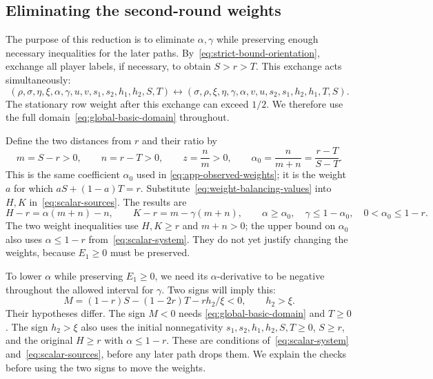 \documentclass[11pt]{article}
\theoremstyle{remark}
\theoremstyle{plain}
\begin{document}
\subsection{Eliminating the second-round weights}
\label{app:weights}

The purpose of this reduction is to eliminate $\alpha,\gamma$
while preserving enough necessary inequalities for the later paths.
By~\eqref{eq:strict-bound-orientation}, exchange all player labels,
if necessary, to obtain $S>r>T$. This exchange acts simultaneously:
\begin{equation}
 (\rho,\sigma,\eta,\xi,\alpha,\gamma,u,v,s_1,s_2,h_1,h_2,S,T)
 \longleftrightarrow
 (\sigma,\rho,\xi,\eta,\gamma,\alpha,v,u,s_2,s_1,h_2,h_1,T,S).
 \label{eq:weight-exchange}
\end{equation}
The stationary row weight after this exchange can exceed $1/2$.
We therefore use the full domain~\eqref{eq:global-basic-domain}
throughout.

Define the two distances from $r$ and their ratio by
\begin{equation}
 m=S-r>0,\qquad n=r-T>0,\qquad
 z=\frac nm>0,\qquad \alpha_0=\frac{n}{m+n}=\frac{r-T}{S-T}.
 \label{eq:weight-balancing-values}
\end{equation}
This is the same coefficient $\alpha_0$ used in
\eqref{eq:app-observed-weights}; it is the weight $a$ for which
$aS+(1-a)T=r$.
Substitute~\eqref{eq:weight-balancing-values} into $H,K$
in~\eqref{eq:scalar-sources}. The results are
\begin{equation}
 H-r=\alpha(m+n)-n,\qquad K-r=m-\gamma(m+n),
 \qquad
 \alpha\ge \alpha_0,\quad\gamma\le1-\alpha_0,\quad0<\alpha_0\le1-r.
 \label{eq:weight-source-restrictions}
\end{equation}
The two weight inequalities use $H,K\ge r$ and $m+n>0$;
the upper bound on $\alpha_0$ also uses $\alpha\le1-r$
from~\eqref{eq:scalar-system}. They do not yet justify changing
the weights, because $E_1\ge0$ must be preserved.

To lower $\alpha$ while preserving $E_1\ge0$, we need its
$\alpha$-derivative to be negative throughout the allowed interval
for $\gamma$. Two signs will imply this:
\begin{equation}
 M=(1-r)S-(1-2r)T-rh_2/\xi<0,\qquad h_2>\xi.
 \label{eq:weight-derivative-signs}
\end{equation}
Their hypotheses differ. The sign $M<0$ needs
\eqref{eq:global-basic-domain} and $T\ge0$. The sign $h_2>\xi$
also uses the initial nonnegativity
$s_1,s_2,h_1,h_2,S,T\ge0$, $S\ge r$, and the original
$H\ge r$ with $\alpha\le1-r$. These are conditions
of~\eqref{eq:scalar-system} and~\eqref{eq:scalar-sources}, before
any later path drops them. We explain the checks before using
the two signs to move the weights.
\end{document}
